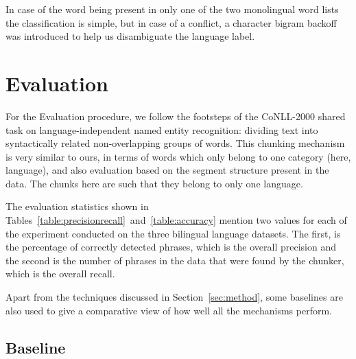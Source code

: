 \documentclass[11pt]{article}
\begin{document}
In case of the word being present in only one of the two monolingual word lists the classification is simple, 
but in case of a conflict, a character bigram backoff was introduced to help us disambiguate the language label. 




\vspace{-0.132cm}
\section{Evaluation}
\vspace{-0.132cm}
\label{sec:eval}

For the Evaluation procedure, we follow the footsteps of the CoNLL-2000 shared task on language-independent 
named entity recognition: dividing text into syntactically related non-overlapping groups of words. This 
chunking mechanism \cite{tjong2003introduction} is very similar to ours, in terms of words which only belong to 
one category (here, language), and also evaluation based on the segment structure present in the data. The chunks 
here are such that they belong to only one language. 

The evaluation statistics shown 
in Tables~\ref{table:precisionrecall}~and~\ref{table:accuracy} mention two values for each of the experiment conducted on the three bilingual 
language datasets. The first, is the percentage of correctly detected phrases, which is the overall precision and the second is the 
number of phrases in the data that were found by the chunker, which is the overall recall. 

Apart from the techniques discussed in Section~\ref{sec:method}, some baselines are also used to give a comparative view of how well all the mechanisms perform.

\subsection{Baseline}
\vspace{-0.132cm}
\label{baseline}
\end{document}

